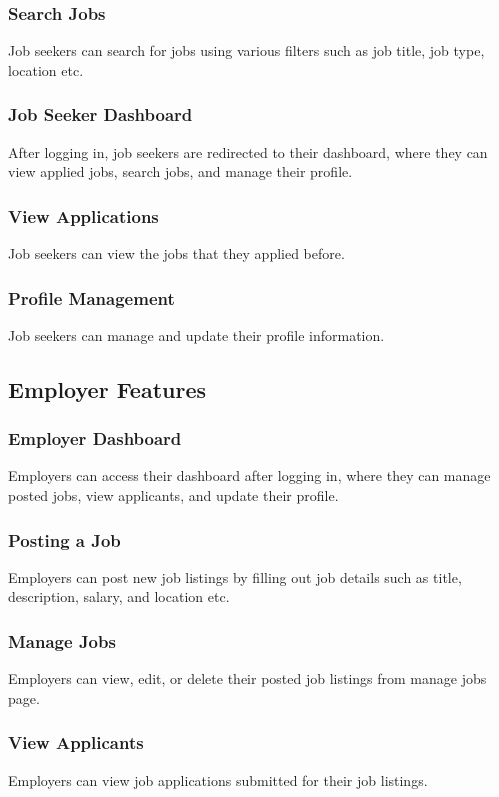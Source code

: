 \documentclass[a4paper,12pt]{article}
\begin{document}
\subsubsection{Search Jobs}
Job seekers can search for jobs using various filters such as job title,  job type, location etc.

\subsubsection{Job Seeker Dashboard}
After logging in, job seekers are redirected to their dashboard, where they can view applied jobs, search jobs, and manage their profile.

\subsubsection{View Applications}
Job seekers can view the jobs that they applied before.

\subsubsection{Profile Management}
Job seekers can manage and update their profile information.

\newpage

\subsection{Employer Features}
\subsubsection{Employer Dashboard}
Employers can access their dashboard after logging in, where they can manage posted jobs, view applicants, and update their profile.

\subsubsection{Posting a Job}
Employers can post new job listings by filling out job details such as title, description, salary, and location etc.

\subsubsection{Manage Jobs}
Employers can view, edit, or delete their posted job listings from manage jobs page.

\subsubsection{View Applicants}
Employers can view job applications submitted for their job listings.
\end{document}
